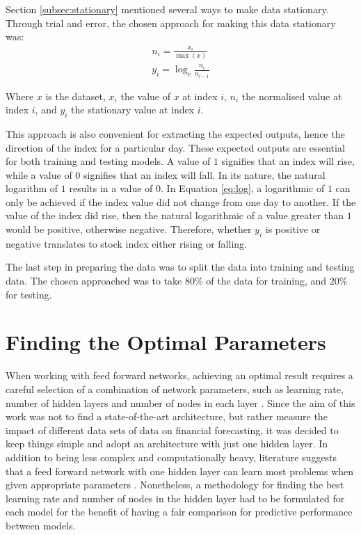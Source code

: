 \documentclass{UoYCSproject}
\begin{document}
Section \ref{subsec:stationary} mentioned several ways to make data stationary. Through trial and error, the chosen approach for making this data stationary was:
\begin{align}
n_i = \frac{x_i}{\max(x)} \label{eq:normalised} \\ 
y_i = \log_e\frac{n_i}{n_{i-1}} \label{eq:log} 
\end{align}

Where $x$ is the dataset, $x_i$ the value of $x$ at index $i$, $n_i$ the normalised value at index $i$, and $y_i$ the stationary value at index $i$. 

This approach is also convenient for extracting the expected outputs, hence the direction of the index for a particular day. These expected outputs are essential for both training and testing models. A value of $1$ signifies that an index will rise, while a value of $0$ signifies that an index will fall. In its nature, the natural logarithm of $1$ results in a value of 0. In Equation \ref{eq:log}, a logarithmic of $1$ can only be achieved if the index value did not change from one day to another. If the value of the index did rise, then the natural logarithmic of a value greater than $1$ would be positive, otherwise negative. Therefore, whether $y_i$ is positive or negative translates to stock index either rising or falling.

The last step in preparing the data was to split the data into training and testing data. The chosen approached was to take $80$\% of the data for training, and $20$\% for testing.

\section{Finding the Optimal Parameters}
\label{sec:optimalparams}
When working with feed forward networks, achieving an optimal result requires a careful selection of a combination of network parameters, such as learning rate, number of hidden layers and number of nodes in each layer \cite{hussain2008financial}. Since the aim of this work was not to find a state-of-the-art architecture, but rather measure the impact of different data sets of data on financial forecasting, it was decided to keep things simple and adopt an architecture with just one hidden layer. In addition to being less complex and computationally heavy, literature suggests that a feed forward network with one hidden layer can learn most problems when given appropriate parameters \cite{cybenko1989approximation}. Nonetheless, a methodology for finding the best learning rate and number of nodes in the hidden layer had to be formulated for each model for the benefit of having a fair comparison for predictive performance between models.   
\end{document}
